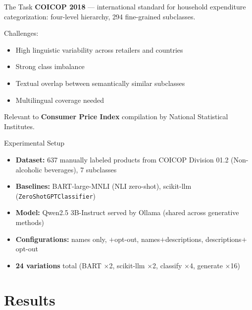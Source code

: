 \documentclass[aspectratio=169,11pt]{beamer}
\begin{document}
\begin{frame}{The Task}
  \textbf{COICOP 2018} — international standard for household expenditure
  categorization: four-level hierarchy, 294 fine-grained subclasses.

  \vspace{0.4em}
  Challenges:
  \begin{itemize}
    \item High linguistic variability across retailers and countries
    \item Strong class imbalance
    \item Textual overlap between semantically similar subclasses
    \item Multilingual coverage needed
  \end{itemize}

  \vspace{0.3em}
  Relevant to \textbf{Consumer Price Index} compilation by National
  Statistical Institutes.
\end{frame}

\begin{frame}{Experimental Setup}
  \begin{itemize}
    \item \textbf{Dataset:} 637 manually labeled products from COICOP
          Division 01.2 (Non-alcoholic beverages), 7 subclasses
    \item \textbf{Baselines:} BART-large-MNLI (NLI zero-shot), scikit-llm
          (\texttt{ZeroShotGPTClassifier})
    \item \textbf{Model:} Qwen2.5 3B-Instruct served by Ollama (shared across
          generative methods)
    \item \textbf{Configurations:} names only, $+$opt-out,
          names$+$descriptions, descriptions$+$opt-out
    \item \textbf{24 variations} total (BART $\times$2, scikit-llm $\times$2,
          classify $\times$4, generate $\times$16)
  \end{itemize}
\end{frame}

\section{Results}
\end{document}
